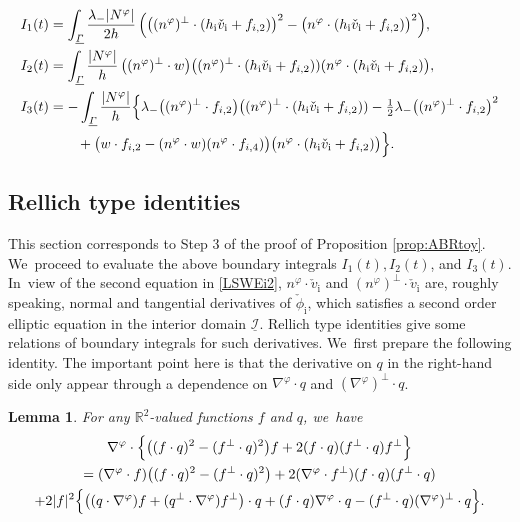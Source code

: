 \documentclass[11pt]{article}
\newcommand{\R}{{\mathbb R}}
\newcommand{\cI}{{\mathcal I}}
\newcommand{\ul}[1]{\underline{#1}}
\newcommand{\itGamma}{\mathit{\Gamma}}
\newtheorem{lemma}[theorem]{Lemma}
\theoremstyle{definition}
\begin{document}
\begin{align*}
I_1(t)
&= \int_{\ul{\itGamma}}\frac{\lambda_-|N^\varphi|}{2h}\,
\Bigl(\bigl((n^\varphi)^\perp\cdot(h_\mathrm{i}\check{v}_\mathrm{i}+f_{{\rm i},2}) \bigr)^2 - \bigl(n^\varphi\cdot(h_\mathrm{i}\check{v}_\mathrm{i}+f_{{\rm i},2}) \bigr)^2 \Bigr), \\
I_2(t)
&= \int_{\ul{\itGamma}}\frac{|N^\varphi|}{h}\,
\bigl((n^\varphi)^\perp\cdot w \bigr) \bigl((n^\varphi)^\perp\cdot(h_\mathrm{i}\check{v}_\mathrm{i}+f_{{\rm i},2}))(n^\varphi\cdot(h_\mathrm{i}\check{v}_\mathrm{i}+f_{{\rm i},2}) \bigr), \\
I_3(t)
&= -\int_{\ul{\itGamma}}\frac{|N^\varphi|}{h}\Bigl\{
\lambda_- \bigl((n^\varphi)^\perp\cdot f_{{\rm i},2} \bigr) \bigl((n^\varphi)^\perp\cdot(h_\mathrm{i}\check{v}_\mathrm{i}+f_{{\rm i},2}))
- \tfrac12\lambda_- \bigl((n^\varphi)^\perp\cdot f_{{\rm i},2} \bigr)^2 \\
&\qquad
+ \bigl(w\cdot f_{{\rm i},2} - (n^\varphi\cdot w)(n^\varphi\cdot f_{{\rm i},4}) \bigr) \bigl(n^\varphi\cdot(h_\mathrm{i}\check{v}_\mathrm{i}+f_{{\rm i},2}) \bigr) \Bigr\}.
\end{align*}

\subsection{Rellich type identities}
This section corresponds to Step 3 of the proof of Proposition \ref{prop:ABRtoy}. We~proceed to evaluate the above boundary integrals $I_1(t),I_2(t)$, and $I_3(t)$. In~view of the second equation in \eqref{LSWEi2}, $n^\varphi\cdot \check{v}_\mathrm{i}$ and $(n^\varphi)^\perp\cdot \check{v}_\mathrm{i}$ are, roughly speaking,
normal and tangential derivatives of $\check{\phi}_\mathrm{i}$, which satisfies a second order elliptic equation in the interior domain $\ul{\cI}$.
Rellich type identities give some relations of boundary integrals for such derivatives. We~first prepare the following identity.
The important point here is that the derivative on $q$ in the right-hand side only appear through a dependence on $\nabla^\varphi\cdot q$
and $(\nabla^\varphi)^\perp\cdot q$.

\begin{lemma}\label{lem:Rellich1}
For any $\R^2$-valued functions $f$ and $q$, we~have
\begin{multline*}
\nabla^\varphi\cdot\Bigl\{ \bigl((f\cdot q)^2-(f^\perp\cdot q)^2 \bigr)f + 2(f\cdot q)(f^\perp\cdot q)f^\perp \Bigr\} \\
= (\nabla^\varphi\cdot f)\bigl((f\cdot q)^2-(f^\perp\cdot q)^2 \bigr) + 2(\nabla^\varphi\cdot f^\perp)(f\cdot q)(f^\perp\cdot q) \\
+ 2|f|^2\Bigl\{ \bigl((q\cdot\nabla^\varphi)f + (q^\perp\cdot\nabla^\varphi)f^\perp \bigr)\cdot q
+ (f\cdot q)\nabla^\varphi\cdot q - (f^\perp\cdot q)(\nabla^\varphi)^\perp\cdot q \Bigr\}.
\end{multline*}
\end{lemma}
\end{document}
